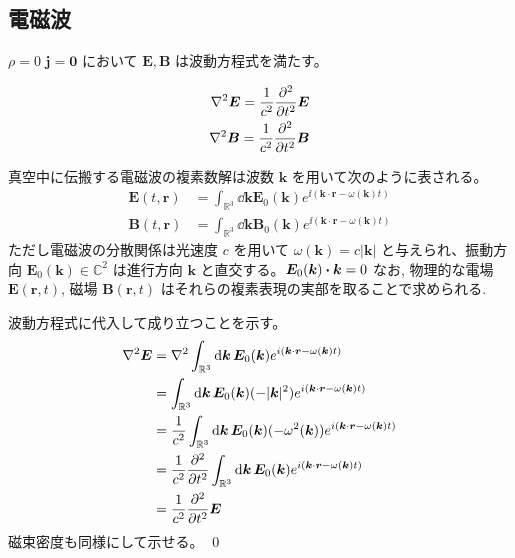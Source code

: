 \documentclass[uplatex,dvipdfmx,a4paper,11pt]{jlreq}
\makeatletter
\newcommand{\CC}{\mathbb{C}}
\newcommand{\RR}{\mathbb{R}}
\newcommand{\EE}{\bm{E}}
\newcommand{\BB}{\bm{B}}
\newcommand{\rr}{\bm{r}}
\newcommand{\kk}{\bm{k}}
\theoremstyle{definition}
\renewenvironment{proof}[1][\proofname]{\par
  \normalfont
  \topsep6\p@\@plus6\p@ \trivlist
  \item[\hskip\labelsep{\bfseries #1}\@addpunct{\bfseries}]\ignorespaces\quad\par
}{%
  \qed\endtrivlist\@endpefalse
}
\renewcommand\proofname{証明}
\makeatother
\begin{document}
\subsection{電磁波}
\begin{proposition}
  $\rho = 0$ $\bm{j} = \bm{0}$ において $\EE, \BB$ は波動方程式を満たす。
\end{proposition}
\begin{align}
  \nabla^2\EE = \frac{1}{c^2}\pdv[2]{t}\EE \\
  \nabla^2\BB = \frac{1}{c^2}\pdv[2]{t}\BB
\end{align}

\begin{theorem}[]
  真空中に伝搬する電磁波の複素数解は波数 $\kk$ を用いて次のように表される。
  \begin{align}
    \EE(t, \rr) & = \int_{\RR^3}\dd{\kk}\EE_0(\kk)e^{\ii(\kk\cdot\rr - \omega(\kk)t)} \\
    \BB(t, \rr) & = \int_{\RR^3}\dd{\kk}\BB_0(\kk)e^{\ii(\kk\cdot\rr - \omega(\kk)t)}
  \end{align}
  ただし電磁波の分散関係は光速度 $c$ を用いて $\omega(\kk) = c|\kk|$ と与えられ、振動方向 $\EE_0(\kk)\in\CC^2$ は進行方向 $\kk$ と直交する。$\EE_0(\kk)\vdot\kk = 0$
  なお, 物理的な電場 $\EE(\rr, t)$, 磁場 $\BB(\rr, t)$ はそれらの複素表現の実部を取ることで求められる.
\end{theorem}
\begin{proof}
  波動方程式に代入して成り立つことを示す。
  \begin{align}
    \nabla^2\EE & = \nabla^2\int_{\RR^3}\dd{\kk}\EE_0(\kk)e^{\ii(\kk\cdot\rr - \omega(\kk)t)}                      \\
                & = \int_{\RR^3}\dd{\kk}\EE_0(\kk)(-|\kk|^2)e^{\ii(\kk\cdot\rr - \omega(\kk)t)}                    \\
                & = \frac{1}{c^2}\int_{\RR^3}\dd{\kk}\EE_0(\kk)(-\omega^2(\kk))e^{\ii(\kk\cdot\rr - \omega(\kk)t)} \\
                & = \frac{1}{c^2}\pdv[2]{t}\int_{\RR^3}\dd{\kk}\EE_0(\kk)e^{\ii(\kk\cdot\rr - \omega(\kk)t)}       \\
                & = \frac{1}{c^2}\pdv[2]{t}\EE
  \end{align}
  磁束密度も同様にして示せる。
\end{proof}
\end{document}
